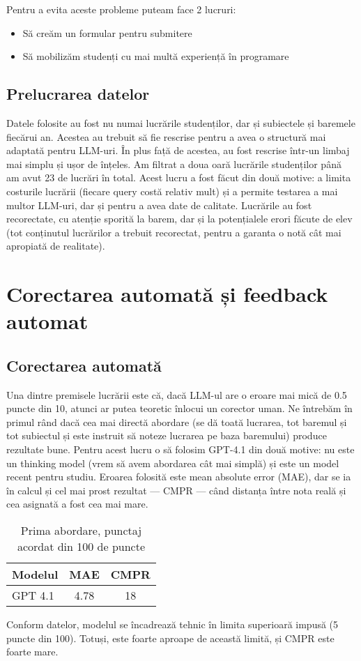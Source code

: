 \documentclass[12pt, a4paper]{report}
\begin{document}
Pentru a evita aceste probleme puteam face 2 lucruri:
\begin{itemize}
  \item Să creăm un formular pentru submitere
  \item Să mobilizăm studenți cu mai multă experiență în programare
\end{itemize}


\section{Prelucrarea datelor}
Datele folosite au fost nu numai lucrările studenților, dar și subiectele și baremele fiecărui an. Acestea au trebuit să fie rescrise pentru a avea o structură mai adaptată pentru LLM-uri.  
În plus față de acestea, au fost rescrise într-un limbaj mai simplu și ușor de înțeles. Am filtrat a doua oară lucrările studenților până am avut 23 de lucrări în total. Acest lucru a fost făcut din două motive: a limita costurile lucrării (fiecare query costă relativ mult) și a permite testarea a mai multor LLM-uri, dar și pentru a avea date de calitate.  
Lucrările au fost recorectate, cu atenție sporită la barem, dar și la potențialele erori făcute de elev (tot conținutul lucrărilor a trebuit recorectat, pentru a garanta o notă cât mai apropiată de realitate).

\chapter{Corectarea automată și feedback automat}
\section{Corectarea automată}

Una dintre premisele lucrării este că, dacă LLM-ul are o eroare mai mică de 0.5 puncte din 10, atunci ar putea teoretic înlocui un corector uman.  
Ne întrebăm în primul rând dacă cea mai directă abordare (se dă toată lucrarea, tot baremul și tot subiectul și este instruit să noteze lucrarea pe baza baremului) produce rezultate bune.  
Pentru acest lucru o să folosim GPT-4.1 din două motive: nu este un thinking model (vrem să avem abordarea cât mai simplă) și este un model recent pentru studiu.  
Eroarea folosită este mean absolute error (MAE), dar se ia în calcul și cel mai prost rezultat — CMPR — când distanța între nota reală și cea asignată a fost cea mai mare.

\begin{table}[h!]
\centering
\begin{tabular}{|l|c|c|}
\hline
\textbf{Modelul} & \textbf{MAE} & \textbf{CMPR} \\
\hline
GPT 4.1 & 4.78 & 18\\
\hline
\end{tabular}
\caption{Prima abordare, punctaj acordat din 100 de puncte}

\end{table}
Conform datelor, modelul se încadrează tehnic în limita superioară impusă (5 puncte din 100). Totuși, este foarte aproape de această limită, și CMPR este foarte mare.
\end{document}

